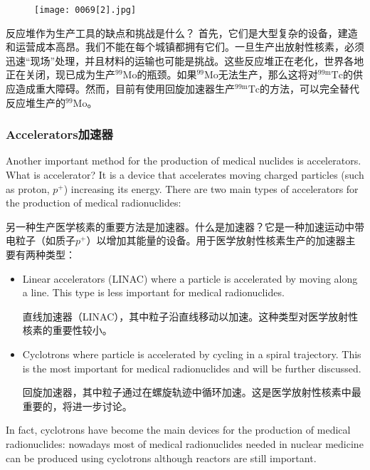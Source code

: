 \documentclass[dvipsnames, svgnames,a4paper,11pt]{article}
\begin{document}
    \begin{figure}[H]
    \centering
    \texttt{[image: 0069[2].jpg]}
     \label{fig60}
    \end{figure}

反应堆作为生产工具的缺点和挑战是什么？
首先，它们是大型复杂的设备，建造和运营成本高昂。我们不能在每个城镇都拥有它们。一旦生产出放射性核素，必须迅速“现场”处理，并且材料的运输也可能是挑战。这些反应堆正在老化，世界各地正在关闭，现已成为生产${}^\text{99}\text{Mo}$的瓶颈。如果${}^\text{99}\text{Mo}$无法生产，那么这将对${}^\text{99m}\text{Tc}$的供应造成重大障碍。然而，目前有使用回旋加速器生产${}^\text{99m}\text{Tc}$的方法，可以完全替代反应堆生产的${}^\text{99}\text{Mo}$。


\subsubsection{Accelerators加速器}

Another important method for the production of medical nuclides is accelerators. What is accelerator? It is a device that accelerates moving charged particles (such as proton, $p^+$) increasing its energy. There are two main types of accelerators for the production of medical radionuclides:

另一种生产医学核素的重要方法是加速器。什么是加速器？它是一种加速运动中带电粒子（如质子$p^+$）以增加其能量的设备。用于医学放射性核素生产的加速器主要有两种类型：

\begin{itemize}
\item Linear accelerators (LINAC) where a particle is accelerated by moving along a line. This type is less important for medical radionuclides.  
      
直线加速器（LINAC），其中粒子沿直线移动以加速。这种类型对医学放射性核素的重要性较小。  

\item Cyclotrons where particle is accelerated by cycling in a spiral trajectory. This is the most important for medical radionuclides and will be further discussed.
      
回旋加速器，其中粒子通过在螺旋轨迹中循环加速。这是医学放射性核素中最重要的，将进一步讨论。

\end{itemize}

In fact, cyclotrons have become the main devices for the production of medical radionuclides: nowadays most of medical radionuclides needed in nuclear medicine can be produced using cyclotrons although reactors are still important.
\end{document}
